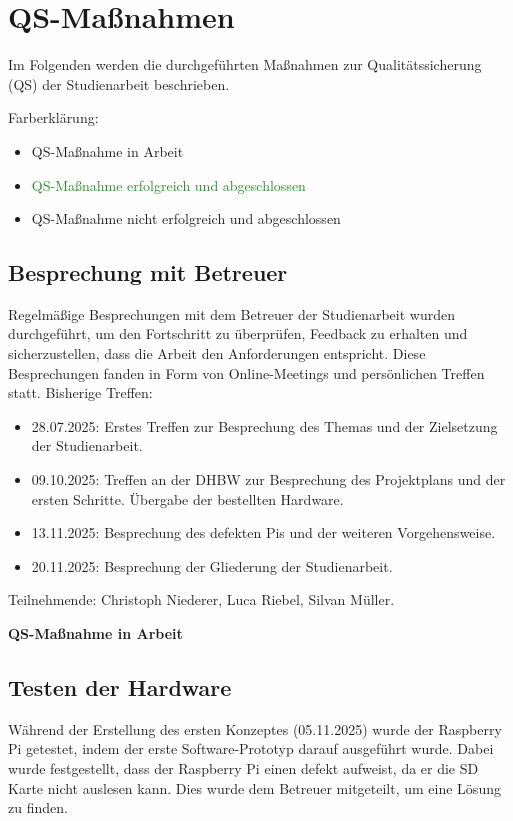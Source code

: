 \chapter{QS-Maßnahmen}
Im Folgenden werden die durchgeführten Maßnahmen zur Qualitätssicherung (QS) der Studienarbeit beschrieben.

Farberklärung:
\begin{itemize}
    \item {\textcolor{yellow!80!brown}{QS-Maßnahme in Arbeit}}
    \item {\textcolor{ForestGreen}{QS-Maßnahme erfolgreich und abgeschlossen}}
    \item {\textcolor{red!80!black}{QS-Maßnahme nicht erfolgreich und abgeschlossen}}
\end{itemize}
\section{Besprechung mit Betreuer}
Regelmäßige Besprechungen mit dem Betreuer der Studienarbeit wurden durchgeführt, um den Fortschritt zu überprüfen, Feedback zu erhalten und sicherzustellen, dass die Arbeit den Anforderungen entspricht. Diese Besprechungen fanden in Form von Online-Meetings und persönlichen Treffen statt.
Bisherige Treffen: 
\begin{itemize}
    \item 28.07.2025: Erstes Treffen zur Besprechung des Themas und der Zielsetzung der Studienarbeit.
    \item 09.10.2025: Treffen an der DHBW zur Besprechung des Projektplans und der ersten Schritte. Übergabe der bestellten Hardware.
    \item 13.11.2025: Besprechung des defekten Pis und der weiteren Vorgehensweise.
    \item 20.11.2025: Besprechung der Gliederung der Studienarbeit.
\end{itemize}

Teilnehmende: Christoph Niederer, Luca Riebel, Silvan Müller.

\textcolor{yellow!80!brown}{\textbf{QS-Maßnahme in Arbeit}}
\section{Testen der Hardware}
Während der Erstellung des ersten Konzeptes (05.11.2025) wurde der Raspberry Pi getestet, indem der erste Software-Prototyp darauf ausgeführt wurde. Dabei wurde festgestellt, dass der Raspberry Pi einen defekt aufweist, da er die SD Karte nicht auslesen kann. Dies wurde dem Betreuer mitgeteilt, um eine Lösung zu finden.

